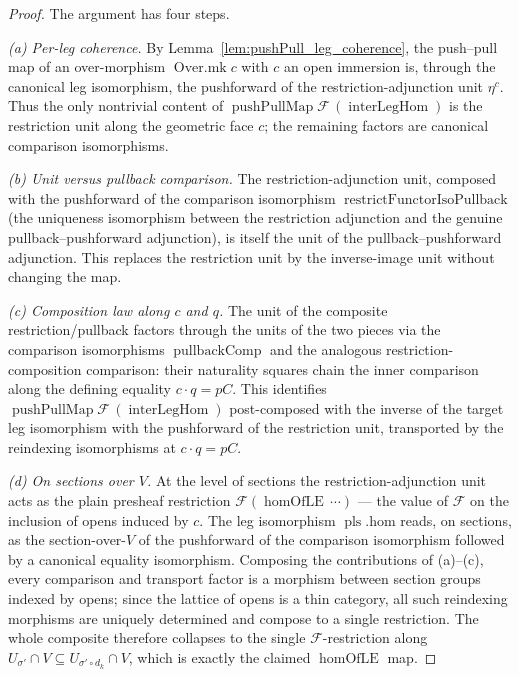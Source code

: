 \begin{proof}
  The argument has four steps.

  \emph{(a) Per-leg coherence.} By Lemma~\ref{lem:pushPull_leg_coherence}, the push--pull map of an
  over-morphism \(\operatorname{Over.mk} c\) with \(c\) an open immersion is, through the canonical
  leg isomorphism, the pushforward of the restriction-adjunction unit \(\eta^c\). Thus the only
  nontrivial content of \(\operatorname{pushPullMap}\mathcal{F}\,(\operatorname{interLegHom})\) is the
  restriction unit along the geometric face \(c\); the remaining factors are canonical comparison
  isomorphisms.

  \emph{(b) Unit versus pullback comparison.} The restriction-adjunction unit, composed with the
  pushforward of the comparison isomorphism \(\operatorname{restrictFunctorIsoPullback}\) (the
  uniqueness isomorphism between the restriction adjunction and the genuine pullback--pushforward
  adjunction), is itself the unit of the pullback--pushforward adjunction. This replaces the
  restriction unit by the inverse-image unit without changing the map.

  \emph{(c) Composition law along \(c\) and \(q\).} The unit of the composite restriction/pullback
  factors through the units of the two pieces via the comparison isomorphisms
  \(\operatorname{pullbackComp}\) and the analogous restriction-composition comparison: their
  naturality squares chain the inner comparison along the defining equality \(c \cdot q = pC\). This
  identifies \(\operatorname{pushPullMap}\mathcal{F}\,(\operatorname{interLegHom})\) post-composed
  with the inverse of the target leg isomorphism with the pushforward of the restriction unit,
  transported by the reindexing isomorphisms at \(c \cdot q = pC\).

  \emph{(d) On sections over \(V\).} At the level of sections the restriction-adjunction unit acts
  as the plain presheaf restriction \(\mathcal{F}(\operatorname{homOfLE}\,\cdots)\) — the value of
  \(\mathcal{F}\) on the inclusion of opens induced by \(c\). The leg isomorphism
  \(\operatorname{pls}.\mathrm{hom}\) reads, on sections, as the section-over-\(V\) of the
  pushforward of the comparison isomorphism followed by a canonical equality isomorphism. Composing the
  contributions of (a)--(c), every comparison and transport factor is a morphism between section
  groups indexed by opens; since the lattice of opens is a thin category, all such reindexing
  morphisms are uniquely determined and compose to a single restriction. The whole composite
  therefore collapses to the single \(\mathcal{F}\)-restriction along
  \(U_{\sigma'} \cap V \subseteq U_{\sigma' \circ d_k} \cap V\), which is exactly the claimed
  \(\operatorname{homOfLE}\) map.
\end{proof}

